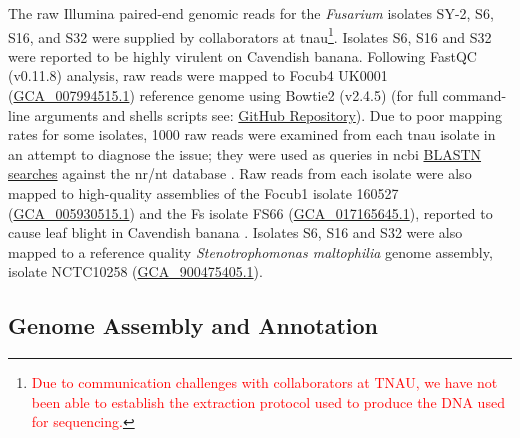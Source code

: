 The raw Illumina paired-end genomic reads for the \textit{Fusarium} isolates SY-2, S6, S16, and S32 were supplied by collaborators at \ac{tnau}\footnote{\textcolor{red}{Due to communication challenges with collaborators at TNAU, we have not been able to establish the extraction protocol used to produce the DNA used for sequencing.}}. Isolates S6, S16 and S32 were reported to be highly virulent on Cavendish banana. Following FastQC (v0.11.8)
\parencite{Andrews2010} analysis, raw reads were mapped to \ac{Focub4} UK0001 (\href{https://www.ncbi.nlm.nih.gov/datasets/genome/GCA_007994515.1/}{GCA\_007994515.1}) \parencite{Warmington2019} reference genome using Bowtie2 (v2.4.5) \parencite{Langmead2012} (for full command-line arguments and shells scripts see: \href{https://github.com/JamiePike/NewTools-Project/blob/master/docs/Assembly/AssemblyNotes.md}{GitHub Repository}). Due to poor mapping rates for some isolates, 1000 raw reads were examined from each \ac{tnau} isolate in an attempt to diagnose the issue; they were used as queries in  \ac{ncbi} \href{https://blast.ncbi.nlm.nih.gov/Blast.cgi?PROGRAM=blastn&BLAST_SPEC=GeoBlast&PAGE_TYPE=BlastSearch}{BLASTN searches} against the nr/nt database \parencite{Nih2014}. Raw reads from each isolate were also mapped to high-quality assemblies of the \ac{Focub1} isolate 160527 (\href{https://www.ncbi.nlm.nih.gov/datasets/genome/GCA_005930515.1/}{GCA\_005930515.1}) \parencite{Asai2019} and the \ac{Fs} isolate FS66 (\href{https://www.ncbi.nlm.nih.gov/datasets/genome/GCA_017165645.1/}{GCA\_017165645.1}), reported to cause leaf blight in Cavendish banana \parencite{Cui2021}. Isolates S6, S16 and S32 were also mapped to a reference quality \textit{Stenotrophomonas maltophilia} genome assembly, isolate NCTC10258 (\href{https://www.ncbi.nlm.nih.gov/datasets/genome/GCF_900475405.1/}{GCA\_900475405.1}). 

\subsection{Genome Assembly and Annotation}


